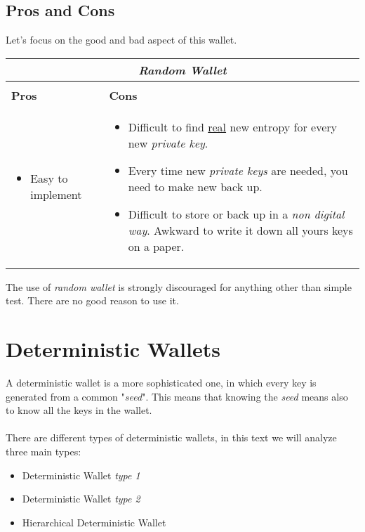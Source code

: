 \subsection{Pros and Cons}
Let's focus on the good and bad aspect of this wallet.

\begin{center}
	\begin{tabular}{ |p{6cm}|p{6cm}|  }
	\hline
	\multicolumn{2}{|c|}{\textbf{\textit{Random Wallet}}} \\
	\hline \hline 
	\\
	\centerline{\textbf{Pros}}&\centerline{\textbf{Cons}}\\
	\hline
	\begin{itemize}
		\item Easy to implement
	\end{itemize} &
	\begin{itemize}
		\item Difficult to find \underline{real} new entropy for every new \textit{private key}.
		\item Every time new \textit{private keys} are needed, you need to make new back up.
		\item Difficult to store or back up in a \textit{non digital way}. Awkward to write it down all yours keys on a paper.
	\end{itemize}\\
	\hline
\end{tabular}
\end{center}

The use of \textit{random wallet} is strongly discouraged for anything other than simple test. There are no good reason to use it.

\section{Deterministic Wallets}
A deterministic wallet is a more sophisticated one, in which every key is generated from a common "\textit{seed}". This means that knowing the \textit{seed} means also to know all the keys in the wallet.\\ \\
There are different types of deterministic wallets, in this text we will analyze three main types:
\begin{itemize}
	\item Deterministic Wallet \textit{type 1}
	\item Deterministic Wallet \textit{type 2}
	\item Hierarchical Deterministic Wallet
\end{itemize}

